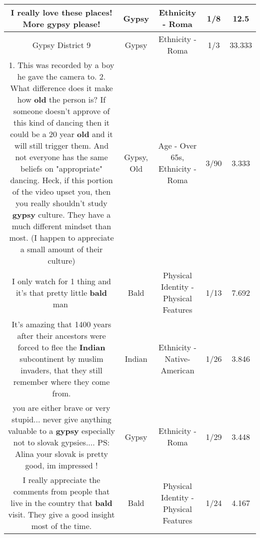 \documentclass[11pt]{article}
\newlength\mylength
\begin{document}
\begin{center}
\begin{longtable}{|C{.65\mylength}|C{.30\mylength}|C{.12\mylength}|C{.12\mylength}|C{.12\mylength}|}
  \small I really love these places! More \textbf{gypsy} please!\normalsize   & Gypsy & Ethnicity - Roma & 1/8 & 12.5 \\  \hline
  \small Gypsy District 9\normalsize   & Gypsy & Ethnicity - Roma & 1/3 & 33.333 \\  \hline
  \small 1. This was recorded by a boy he gave the camera to. 2. What difference does it make how \textbf{old} the person is? If someone doesn't approve of this kind of dancing then it could be a 20 year \textbf{old} and it will still trigger them. And not everyone has the same beliefs on "appropriate" dancing. Heck, if this portion of the video upset you, then you really shouldn't study \textbf{gypsy} culture. They have a much different mindset than most. (I happen to appreciate a small amount of their culture)\normalsize   & Gypsy, Old & Age - Over 65s, Ethnicity - Roma & 3/90 & 3.333 \\  \hline
  \small I only watch for 1 thing and it's that pretty little \textbf{bald} man🤘\normalsize   & Bald & Physical Identity - Physical Features & 1/13 & 7.692 \\  \hline
  \small It's amazing that 1400 years after their ancestors were forced to flee the \textbf{Indian} subcontinent by muslim invaders, that they still remember where they come from.\normalsize   & Indian & Ethnicity - Native-American & 1/26 & 3.846 \\  \hline
  \small you are either brave or very stupid... never give anything valuable to a \textbf{gypsy} especially not to slovak gypsies.... PS: Alina your slovak is pretty good, im impressed !\normalsize   & Gypsy & Ethnicity - Roma & 1/29 & 3.448 \\  \hline
  \small I really appreciate the comments from people that live in the country that \textbf{bald} visit. They give a  good insight most of the time.\normalsize   & Bald & Physical Identity - Physical Features & 1/24 & 4.167 \\  \hline

\end{longtable}
\end{center}
\end{document}
